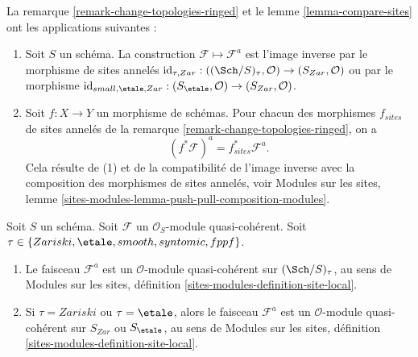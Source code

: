 \begin{remark}
\label{remark-change-topologies-ringed-sites}
La remarque \ref{remark-change-topologies-ringed}
et le
lemme \ref{lemma-compare-sites}
ont les applications suivantes :
\begin{enumerate}
\item Soit $S$ un schéma.
La construction $\mathcal{F} \mapsto \mathcal{F}^a$
est l'image inverse par le morphisme de sites annelés
$\text{id}_{\tau, Zar} : ((\Sch/S)_\tau, \mathcal{O})
\to (S_{Zar}, \mathcal{O})$
ou par le morphisme
$\text{id}_{small, \etale, Zar} :
(S_\etale, \mathcal{O}) \to (S_{Zar}, \mathcal{O})$.
\item Soit $f : X \to Y$ un morphisme de schémas.
Pour chacun des morphismes $f_{sites}$ de sites annelés de la
remarque \ref{remark-change-topologies-ringed},
on a
$$
(f^*\mathcal{F})^a = f_{sites}^*\mathcal{F}^a.
$$
Cela résulte de (1) et de la compatibilité de l'image inverse avec
la composition des morphismes de sites annelés, voir
Modules sur les sites,
lemme \ref{sites-modules-lemma-push-pull-composition-modules}.
\end{enumerate}
\end{remark}

\begin{lemma}
\label{lemma-quasi-coherent-gives-quasi-coherent}
Soit $S$ un schéma.
Soit $\mathcal{F}$ un $\mathcal{O}_S$-module quasi-cohérent.
Soit $\tau \in \{Zariski, \linebreak[0] \etale, \linebreak[0]
smooth, \linebreak[0] syntomic, \linebreak[0] fppf\}$.
\begin{enumerate}
\item Le faisceau $\mathcal{F}^a$ est un $\mathcal{O}$-module
quasi-cohérent sur $(\Sch/S)_\tau$, au sens de
Modules sur les sites, définition \ref{sites-modules-definition-site-local}.
\item Si $\tau = Zariski$ ou $\tau = \etale$, alors le faisceau
$\mathcal{F}^a$ est un $\mathcal{O}$-module quasi-cohérent sur
$S_{Zar}$ ou $S_\etale$, au sens de
Modules sur les sites, définition \ref{sites-modules-definition-site-local}.
\end{enumerate}
\end{lemma}

